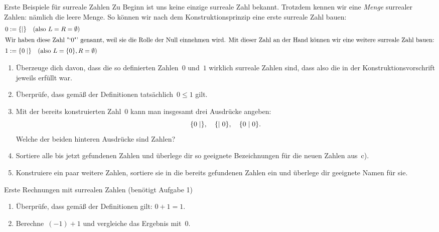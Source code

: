 \documentclass{zirkelblatt}
\begin{document}
\newpage

\begin{aufgabe}{Erste Beispiele für surreale Zahlen}
Zu Beginn ist uns keine einzige surreale Zahl bekannt. Trotzdem kennen wir
eine \emph{Menge} surrealer Zahlen: nämlich die leere Menge. So können wir nach
dem Konstruktionsprinzip eine erste surreale Zahl bauen:
\begin{align*}
  0 &:= \{  \mathrel{|}  \} \quad\text{(also $L = R = \emptyset$)} \\
\intertext{Wir haben diese Zahl~"`$0$"' genannt, weil sie die Rolle der Null einnehmen
wird. Mit dieser Zahl an der Hand können wir eine weitere surreale Zahl bauen:}
  1 &:= \{ 0 \mathrel{|}  \} \quad\text{(also $L = \{ 0 \}, R = \emptyset$)}
\end{align*}

\begin{enumerate}
\item Überzeuge dich davon, dass die so definierten Zahlen~$0$ und~$1$ wirklich
surreale Zahlen sind, dass also die  in der Konstruktionsvorschrift
jeweils erfüllt war.

\item Überprüfe, dass gemäß der Definitionen tatsächlich~$0 \leq 1$ gilt.

\item Mit der bereits konstruierten Zahl~$0$ kann man insgesamt drei Ausdrücke
angeben:
\[ \{ 0 \mathrel{|}  \}, \quad \{  \mathrel{|} 0 \}, \quad \{ 0 \mathrel{|} 0 \}. \]
Welche der beiden hinteren Ausdrücke sind Zahlen?

\item Sortiere alle bis jetzt gefundenen Zahlen und überlege dir so geeignete
Bezeichnungen für die neuen Zahlen aus~c).

\item Konstruiere ein paar weitere Zahlen, sortiere sie in die bereits
gefundenen Zahlen ein und überlege dir geeignete Namen für sie.
\end{enumerate}
\end{aufgabe}

\begin{aufgabe}{Erste Rechnungen mit surrealen Zahlen (benötigt Aufgabe 1)}
\begin{enumerate}
\item Überprüfe, dass gemäß der Definitionen gilt: $0 + 1 = 1$.
\item Berechne~$(-1) + 1$ und vergleiche das Ergebnis mit~$0$.
\end{enumerate}
\end{aufgabe}
\end{document}
